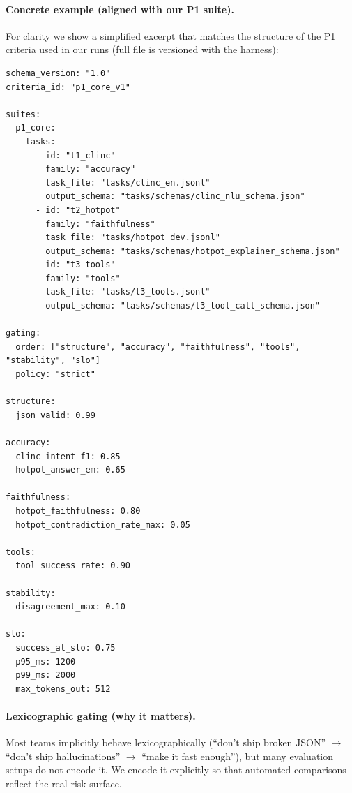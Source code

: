\documentclass[11pt]{article}
\begin{document}
\paragraph{Concrete example (aligned with our P1 suite).}
For clarity we show a simplified excerpt that matches the structure of the P1 criteria used in our runs (full file is versioned with the harness):

\begin{lstlisting}[basicstyle=\ttfamily\small]
schema_version: "1.0"
criteria_id: "p1_core_v1"

suites:
  p1_core:
    tasks:
      - id: "t1_clinc"
        family: "accuracy"
        task_file: "tasks/clinc_en.jsonl"
        output_schema: "tasks/schemas/clinc_nlu_schema.json"
      - id: "t2_hotpot"
        family: "faithfulness"
        task_file: "tasks/hotpot_dev.jsonl"
        output_schema: "tasks/schemas/hotpot_explainer_schema.json"
      - id: "t3_tools"
        family: "tools"
        task_file: "tasks/t3_tools.jsonl"
        output_schema: "tasks/schemas/t3_tool_call_schema.json"

gating:
  order: ["structure", "accuracy", "faithfulness", "tools", "stability", "slo"]
  policy: "strict"

structure:
  json_valid: 0.99

accuracy:
  clinc_intent_f1: 0.85
  hotpot_answer_em: 0.65

faithfulness:
  hotpot_faithfulness: 0.80
  hotpot_contradiction_rate_max: 0.05

tools:
  tool_success_rate: 0.90

stability:
  disagreement_max: 0.10

slo:
  success_at_slo: 0.75
  p95_ms: 1200
  p99_ms: 2000
  max_tokens_out: 512
\end{lstlisting}

\paragraph{Lexicographic gating (why it matters).}
Most teams implicitly behave lexicographically (``don’t ship broken JSON'' $\rightarrow$ ``don’t ship hallucinations'' $\rightarrow$ ``make it fast enough''), but many evaluation setups do not encode it.
We encode it explicitly so that automated comparisons reflect the real risk surface.
\end{document}
